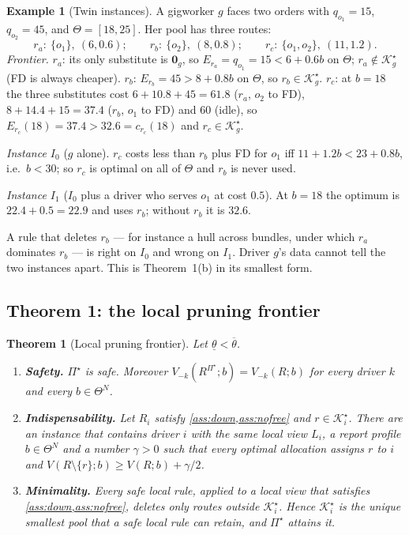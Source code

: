 \documentclass[11pt]{article}
\newtheorem{theorem}{Theorem}
\theoremstyle{definition}
\newtheorem{example}{Example}
\theoremstyle{remark}
\newcommand{\Ks}{\mathcal{K}^{\star}}
\newcommand{\thl}{\underline{\theta}}
\newcommand{\thu}{\overline{\theta}}
\newcommand{\idle}{\mathbf{0}}
\begin{document}
\begin{example}[Twin instances]\label{ex:twin}
A gigworker $g$ faces two orders with $q_{o_1}=15$, $q_{o_2}=45$, and
$\Theta=[18,25]$. Her pool has three routes:
\[
r_a:\ \{o_1\},\ (6,0.6);\qquad r_b:\ \{o_2\},\ (8,0.8);\qquad r_c:\ \{o_1,o_2\},\ (11,1.2).
\]
\emph{Frontier.} $r_a$: its only substitute is $\idle_g$, so
$E_{r_a}=q_{o_1}=15<6+0.6b$ on $\Theta$; $r_a\notin\Ks_g$ (FD is always
cheaper). $r_b$: $E_{r_b}=45>8+0.8b$ on $\Theta$, so $r_b\in\Ks_g$. $r_c$: at
$b=18$ the three substitutes cost $6+10.8+45=61.8$ ($r_a$, $o_2$ to FD),
$8+14.4+15=37.4$ ($r_b$, $o_1$ to FD) and $60$ (idle), so
$E_{r_c}(18)=37.4>32.6=c_{r_c}(18)$ and $r_c\in\Ks_g$.

\emph{Instance $I_0$} ($g$ alone). $r_c$ costs less than $r_b$ plus FD for
$o_1$ iff $11+1.2b<23+0.8b$, i.e.\ $b<30$; so $r_c$ is optimal on all of
$\Theta$ and $r_b$ is never used.

\emph{Instance $I_1$} ($I_0$ plus a driver who serves $o_1$ at cost $0.5$). At
$b=18$ the optimum is $22.4+0.5=22.9$ and uses $r_b$; without $r_b$ it is
$32.6$.

A rule that deletes $r_b$ --- for instance a hull across bundles, under which
$r_a$ dominates $r_b$ --- is right on $I_0$ and wrong on $I_1$. Driver $g$'s
data cannot tell the two instances apart. This is Theorem~1(b) in its smallest
form.
\end{example}

\subsection{Theorem 1: the local pruning frontier}
\label{sec:thm1}

\begin{theorem}[Local pruning frontier]\label{thm:frontier}
Let $\thl<\thu$.
\begin{enumerate}[label=(\alph*), itemsep=2pt]
\item \textbf{Safety.} $\Pi^\star$ is safe. Moreover
$V_{-k}(R^{\Pi^\star};b)=V_{-k}(R;b)$ for every driver $k$ and every
$b\in\Theta^N$.
\item \textbf{Indispensability.} Let $R_i$ satisfy
\cref{ass:down,ass:nofree} and $r\in\Ks_i$. There are an instance that contains
driver $i$ with the same local view $L_i$, a report profile $b\in\Theta^N$ and
a number $\gamma>0$ such that every optimal allocation assigns $r$ to $i$ and
$V(R\setminus\{r\};b)\ge V(R;b)+\gamma/2$.
\item \textbf{Minimality.} Every safe local rule, applied to a local view that
satisfies \cref{ass:down,ass:nofree}, deletes only routes outside $\Ks_i$.
Hence $\Ks_i$ is the unique smallest pool that a safe local rule can retain,
and $\Pi^\star$ attains it.
\end{enumerate}
\end{theorem}
\end{document}
